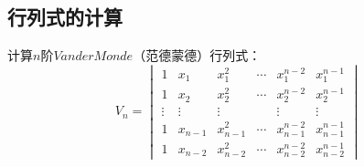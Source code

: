\subsection{行列式的计算}
\begin{example}
  计算$n$阶$Vander Monde$（范德蒙德）行列式：
  \begin{equation*}
    V_n=
    \begin{vmatrix}
      1 & x_1 & x_1^2 & \cdots & x_1^{n-2} & x_1^{n-1}\\[3pt]
      1 & x_2 & x_2^2 & \cdots & x_2^{n-2} & x_2^{n-1}\\[3pt]
      \vdots & \vdots & \vdots & & \vdots & \vdots\\[3pt]
      1 & x_{n-1} & x_{n-1}^2 & \cdots & x_{n-1}^{n-2} & x_{n-1}^{n-1}\\[3pt]
      1 & x_{n-2} & x_{n-2}^2 & \cdots & x_{n-2}^{n-2} & x_{n-2}^{n-1}
    \end{vmatrix}
  \end{equation*}
\end{example}
